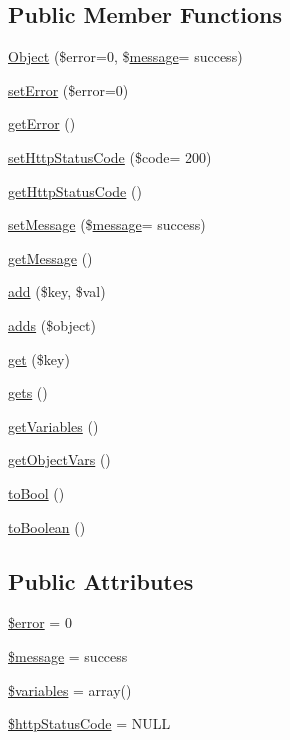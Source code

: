 \subsection*{Public Member Functions}
\begin{DoxyCompactItemize}
\item 
\hyperlink{classObject_a9c1f4bf33208a5c858c0722afce90f30}{Object} (\$error=0, \$\hyperlink{classmessage}{message}= \textquotesingle{}success\textquotesingle{})
\item 
\hyperlink{classObject_a12f7ac70214558a1774ca010865c798e}{set\+Error} (\$error=0)
\item 
\hyperlink{classObject_a2aaced460a018edd69bf17813d6c48df}{get\+Error} ()
\item 
\hyperlink{classObject_a56a37e14694356404f793dd0ab02e2af}{set\+Http\+Status\+Code} (\$code= \textquotesingle{}200\textquotesingle{})
\item 
\hyperlink{classObject_a5cb4abc24dd01e04c24da487d476efc0}{get\+Http\+Status\+Code} ()
\item 
\hyperlink{classObject_aef83a6fcde9ce261446fe4849a33bb10}{set\+Message} (\$\hyperlink{classmessage}{message}= \textquotesingle{}success\textquotesingle{})
\item 
\hyperlink{classObject_a813487b153bfe18102ac76d8c718999f}{get\+Message} ()
\item 
\hyperlink{classObject_a4f8a7fa8794663b7625fc15c9589797b}{add} (\$key, \$val)
\item 
\hyperlink{classObject_a6dbae38facc1000561b8b230847aaca1}{adds} (\$object)
\item 
\hyperlink{classObject_ae6dff49b7ab68822bdb4ce6940c10d3f}{get} (\$key)
\item 
\hyperlink{classObject_ad6f51071a4048c1fed581748065e4d68}{gets} ()
\item 
\hyperlink{classObject_ad33c509ec041fb43c6e25f8155577925}{get\+Variables} ()
\item 
\hyperlink{classObject_afe1fe6fc005389cd616a5e9105de977a}{get\+Object\+Vars} ()
\item 
\hyperlink{classObject_a409216fd5ab386b1e78e311440113f75}{to\+Bool} ()
\item 
\hyperlink{classObject_afafb45098e163c179940c7e1ddc67fe2}{to\+Boolean} ()
\end{DoxyCompactItemize}
\subsection*{Public Attributes}
\begin{DoxyCompactItemize}
\item 
\hyperlink{classObject_a891a586df36cca119a56bb509f582858}{\$error} = 0
\item 
\hyperlink{classObject_af661550c62873d6b6e61f32d68c56973}{\$message} = \textquotesingle{}success\textquotesingle{}
\item 
\hyperlink{classObject_a153e76f6619408780cc2b50cef5100c6}{\$variables} = array()
\item 
\hyperlink{classObject_a82ad6bb41d770d91d9d10a97495669d0}{\$http\+Status\+Code} = N\+U\+L\+L
\end{DoxyCompactItemize}


